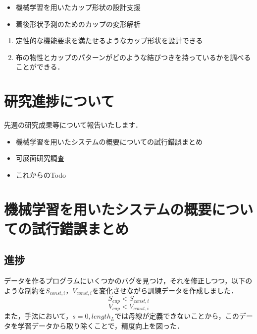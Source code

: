 \documentclass[11pt]{jsarticle}
\begin{document}
	\articleSPRabst
		\begin{itemize}
			\item 機械学習を用いたカップ形状の設計支援
			\item 着後形状予測のためのカップの変形解析
		\end{itemize}
		
		
	\articleSPRobj
		\begin{enumerate}
			\item 定性的な機能要求を満たせるようなカップ形状を設計できる
			\item 布の物性とカップのパターンがどのような結びつきを持っているかを調べることができる．
		\end{enumerate}
	\articleSPRitemsone
		
		\tableofcontents
		
		
	\articleSPRitemstwo
	\renewcommand{\labelitemi}{$\blacktriangledown$}
	\section{研究進捗について}
		先週の研究成果等について報告いたします．
		\begin{itemize}
			\item 機械学習を用いたシステムの概要についての試行錯誤まとめ
			\item 可展面研究調査
			\item これからのTodo
		\end{itemize}
	\section{機械学習を用いたシステムの概要についての試行錯誤まとめ}
		\subsection{進捗}
			データを作るプログラムにいくつかのバグを見つけ，それを修正しつつ，以下のような制約を$S_{const,i}  $，$ V_{const,i} $を変化させながら訓練データを作成しました．
			\begin{equation}\label{eq:size_ineq}
				S_{cup} < S_{const,i}
			\end{equation}
			\begin{equation}\label{eq:volume_ineq}
				V_{cup} < V_{const,i}
			\end{equation}
			また，手法において，$ s=0,length_L $では母線が定義できないことから，このデータを学習データから取り除くことで，精度向上を図った．
\end{document}
